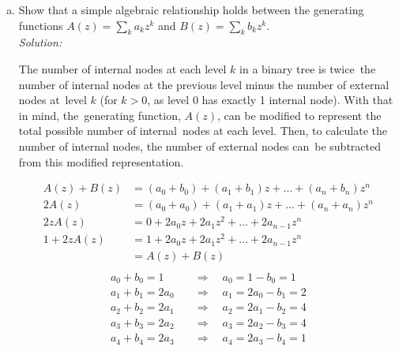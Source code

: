 \documentclass[fontsize=11pt, paper=a4]{scrartcl}
\begin{document}
\begin{enumerate}[(a), leftmargin=1.5cm]
    \item Show that a simple algebraic relationship holds between the generating functions $A(z)=\sum_k a_{k}z^{k}$ and $B(z)=\sum_k b_{k}z^{k}$.
        \vspace{.5cm}
        \\\textit{Solution:}
        \begin{tcolorbox}[breakable, colback=white, colframe=white]
            \qquad The number of internal nodes at each level $k$ in a binary tree is twice\
            the number of internal nodes at the previous level minus the number of external nodes at\
            level $k$ (for $k>0$, as level 0 has exactly 1 internal node). With that in mind, the\
            generating function, $A(z)$, can be modified to represent the total possible number of internal\ 
            nodes at each level. Then, to calculate the number of internal nodes, the number of external nodes can\ 
            be subtracted from this modified representation.
        \end{tcolorbox}
        \begin{align*}        
            A(z)+B(z) &= (a_{0} + b_{0}) + (a_{1} + b_{1})z + \dotsc + (a_{n} + b_{n})z^{n}\\
            2A(z)   &= (a_{0} + a_{0}) + (a_{1} + a_{1})z + \dotsc + (a_{n} + a_{n})z^{n}\\
            2zA(z)  &= 0 + 2a_{0}z + 2a_{1}z^{2} + \dotsc + 2a_{n-1}z^{n}\\
            1 + 2zA(z) &= 1 + 2a_{0}z + 2a_{1}z^{2} + \dotsc + 2a_{n-1}z^{n}\\
            &= A(z)+B(z)\\
        \end{align*}
        \vspace*{-1cm}
        \begin{align*}
            a_{0} + b_{0} = 1       \quad&\Longrightarrow\quad a_{0} = 1 - b_{0} = 1\\
            a_{1} + b_{1} = 2a_{0}  \quad&\Longrightarrow\quad a_{1} = 2a_{0} - b_{1} = 2\\
            a_{2} + b_{2} = 2a_{1}  \quad&\Longrightarrow\quad a_{2} = 2a_{1} - b_{2} = 4\\
            a_{3} + b_{3} = 2a_{2}  \quad&\Longrightarrow\quad a_{3} = 2a_{2} - b_{3} = 4\\
            a_{4} + b_{4} = 2a_{3}  \quad&\Longrightarrow\quad a_{4} = 2a_{3} - b_{4} = 1\\

\end{align*}
\end{enumerate}
\end{document}
